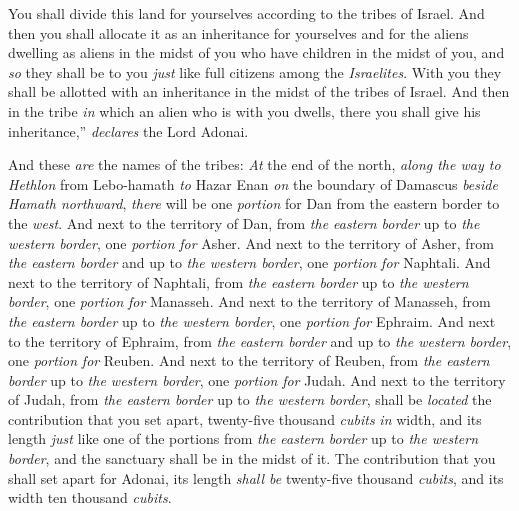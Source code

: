 \begin{biblechapter}
\verse You shall divide this land for yourselves according to the tribes of Israel.
\verse And then you shall allocate it as an inheritance for yourselves and for the aliens dwelling as aliens in the midst of you who have children in the midst of you, and \textit{so} they shall be to you \textit{just} like full citizens among the \textit{Israelites}. With you they shall be allotted with an inheritance in the midst of the tribes of Israel.
\verse And then in the tribe \textit{in} which an alien who is with you dwells, there you shall give his inheritance,” \textit{declares} the Lord Adonai.
\end{biblechapter}

\begin{biblechapter} %
 And these \textit{are} the names of the tribes: \textit{At} the end of the north, \textit{along the way to Hethlon} from Lebo-hamath \textit{to} Hazar Enan \textit{on} the boundary of Damascus \textit{beside Hamath northward}, \textit{there} will be one \textit{portion} for Dan from the eastern border to the \textit{west}.
\verse And next to the territory of Dan, from \textit{the eastern border} up to \textit{the western border}, one \textit{portion} \textit{for} Asher.
\verse And next to the territory of Asher, from \textit{the eastern border} and up to \textit{the western border}, one \textit{portion} \textit{for} Naphtali.
\verse And next to the territory of Naphtali, from \textit{the eastern border} up to \textit{the western border}, one \textit{portion} \textit{for} Manasseh.
\verse And next to the territory of Manasseh, from \textit{the eastern border} up to \textit{the western border}, one \textit{portion} \textit{for} Ephraim.
\verse And next to the territory of Ephraim, from \textit{the eastern border} and up to \textit{the western border}, one \textit{portion} \textit{for} Reuben.
\verse And next to the territory of Reuben, from \textit{the eastern border} up to \textit{the western border}, one \textit{portion} \textit{for} Judah.
\verse And next to the territory of Judah, from \textit{the eastern border} up to \textit{the western border}, shall be \textit{located} the contribution that you set apart, twenty-five thousand \textit{cubits} \textit{in} width, and its length \textit{just} like one of the portions from \textit{the eastern border} up to \textit{the western border}, and the sanctuary shall be in the midst of it.
\verse The contribution that you shall set apart for Adonai, its length \textit{shall be} twenty-five thousand \textit{cubits}, and its width ten thousand \textit{cubits}.

\end{biblechapter}
